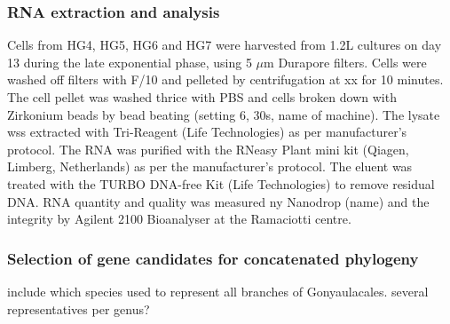 \documentclass[12pt]{article}
\begin{document}
\subsubsection{RNA extraction and analysis}
Cells from HG4, HG5, HG6 and HG7 were harvested from 1.2L cultures on day 13 during the late exponential phase, using 5 $\mu$m Durapore filters. Cells were washed off filters with F/10 and pelleted by centrifugation at xx for 10 minutes. The cell pellet was washed thrice with PBS and cells broken down with Zirkonium beads by bead beating (setting 6, 30s, name of machine). The lysate wss extracted with Tri-Reagent (Life Technologies) as per manufacturer's protocol. The RNA was purified with the RNeasy Plant mini kit (Qiagen, Limberg, Netherlands) as per the manufacturer's protocol. The eluent was treated with the TURBO DNA-free Kit (Life Technologies) to remove residual DNA. RNA quantity and quality was measured ny Nanodrop (name) and the integrity by Agilent 2100 Bioanalyser  at the Ramaciotti centre.


\subsubsection{Selection of gene candidates for concatenated phylogeny}
include which species used to represent all branches of Gonyaulacales. several representatives per genus?





\end{document}
